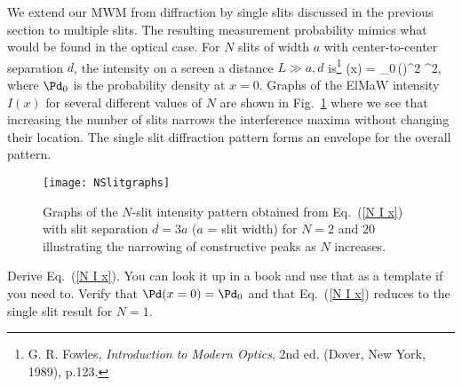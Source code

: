 We extend our MWM from diffraction by single slits discussed in the previous section to multiple slits.  The resulting measurement probability mimics what would be found in the optical case.  For $N$ slits of width $a$ with center-to-center separation $d$, the intensity on a screen a distance $L \gg a,d$ is\footnote{G. R. Fowles, {\em Introduction to Modern Optics}, 2nd ed. (Dover, New York, 1989), p.123.}
%
\beq
\Pd(x) = \Pd_{0}\,\left(\right)^2 ^{2},
\label{N I x}
\eeq
%
where $\Pd_{0}$ is the probability density at $x = 0$.  Graphs of the ElMaW intensity $I(x)$ for several different values of $N$ are shown in Fig.~\ref{N slit graphs} where we see that increasing the number of slits narrows the interference maxima without changing their location.  The single slit diffraction pattern forms an envelope for the overall pattern.
%
\begin{figure}
\begin{center}
\texttt{[image: NSlitgraphs]}
\caption{Graphs of the $N$-slit intensity pattern obtained from Eq.~(\ref{N I x}) with slit separation $d = 3a$ ($a$ = slit width) for $N = 2$ and $20$ illustrating the narrowing of constructive peaks as $N$ increases.}
\label{N slit graphs}
\end{center}
\end{figure}
%
%

\begin{exercise}
Derive Eq.~(\ref{N I x}). You can look it up in a book and use that as a template if you need to. Verify that $\Pd(x = 0) = \Pd_{0}$  and that Eq.~(\ref{N I x}) reduces to the single slit result for $N = 1$.
\end{exercise}

%



